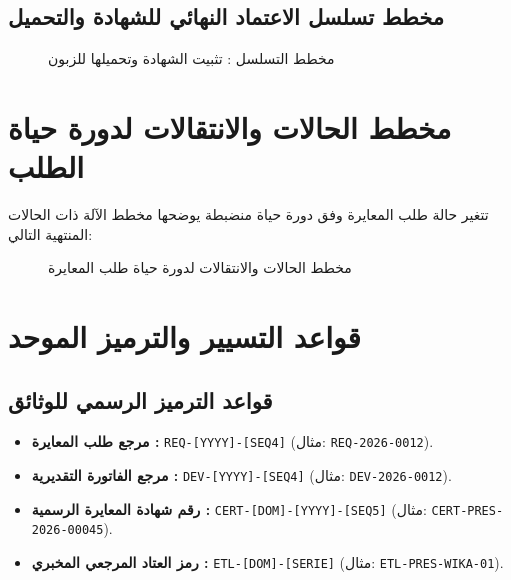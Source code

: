 \documentclass{bts-report-ar}
\begin{document}
\subsection{مخطط تسلسل الاعتماد النهائي للشهادة والتحميل}
\begin{figure}[H]
  \centering
  \begin{LTR}
  
  \end{LTR}
  \caption{مخطط التسلسل : تثبيت الشهادة وتحميلها للزبون}
  \label{fig:seq-certificate}
\end{figure}

\section{مخطط الحالات والانتقالات لدورة حياة الطلب}
تتغير حالة طلب المعايرة وفق دورة حياة منضبطة يوضحها مخطط الآلة ذات الحالات المنتهية التالي:

\begin{figure}[H]
  \centering
  \begin{LTR}
  
  \end{LTR}
  \caption{مخطط الحالات والانتقالات لدورة حياة طلب المعايرة}
  \label{fig:state-request}
\end{figure}

\section{قواعد التسيير والترميز الموحد}
\subsection{قواعد الترميز الرسمي للوثائق}
\begin{itemize}
  \item \textbf{مرجع طلب المعايرة :} \texttt{REQ-[YYYY]-[SEQ4]} (مثال: \texttt{REQ-2026-0012}).
  \item \textbf{مرجع الفاتورة التقديرية :} \texttt{DEV-[YYYY]-[SEQ4]} (مثال: \texttt{DEV-2026-0012}).
  \item \textbf{رقم شهادة المعايرة الرسمية :} \texttt{CERT-[DOM]-[YYYY]-[SEQ5]} (مثال: \texttt{CERT-PRES-2026-00045}).
  \item \textbf{رمز العتاد المرجعي المخبري :} \texttt{ETL-[DOM]-[SERIE]} (مثال: \texttt{ETL-PRES-WIKA-01}).
\end{itemize}
\end{document}
